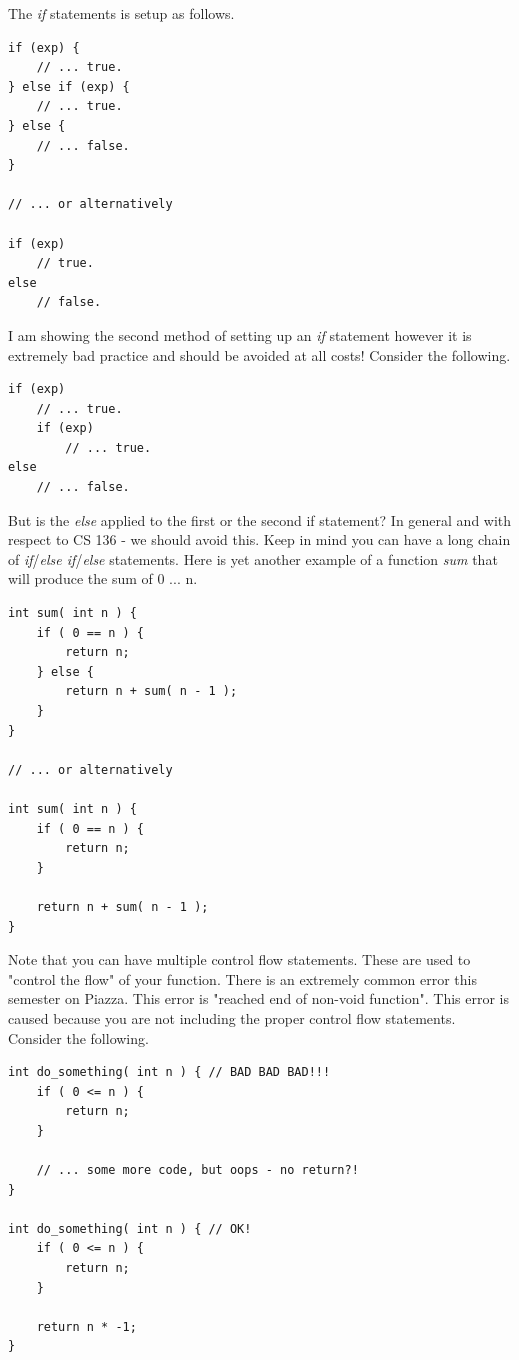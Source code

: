 \documentclass[12pt,extarticle]{article}
\begin{document}
The \emph{if} statements is setup as follows.\\

\lstset {
	language=c
}
\begin{lstlisting}
if (exp) {
	// ... true.
} else if (exp) {
	// ... true.
} else {
	// ... false.
}

// ... or alternatively

if (exp)
	// true.
else
	// false.
\end{lstlisting}

I am showing the second method of setting up an \emph{if} statement however it is extremely bad practice and should be avoided at all costs! Consider the following.\\

\lstset {
	language=c
}
\begin{lstlisting}
if (exp)
	// ... true.
	if (exp)
		// ... true.
else
	// ... false.
\end{lstlisting}

But is the \emph{else} applied to the first or the second if statement? In general and with respect to CS 136 - we should avoid this. Keep in mind you can have a long chain of \textit{if}/\textit{else if}/\textit{else} statements. Here is yet another example of a function \emph{sum} that will produce the sum of 0 ... n.\\

\lstset {
	language=c
}
\begin{lstlisting}
int sum( int n ) {
	if ( 0 == n ) {
		return n;
	} else {
		return n + sum( n - 1 );
	}
}

// ... or alternatively

int sum( int n ) {
	if ( 0 == n ) {
		return n;
	}
	
	return n + sum( n - 1 );
}
\end{lstlisting}

Note that you can have multiple control flow statements. These are used to "control the flow" of your function. There is an extremely common error this semester on Piazza. This error is "reached end of non-void function". This error is caused because you are not including the proper control flow statements. Consider the following.\\

\lstset {
	language=c
}
\begin{lstlisting}
int do_something( int n ) { // BAD BAD BAD!!!
	if ( 0 <= n ) {
		return n;
	}
	
	// ... some more code, but oops - no return?!
}

int do_something( int n ) { // OK!
	if ( 0 <= n ) {
		return n;
	}
	
	return n * -1;
}
\end{lstlisting}
\end{document}
